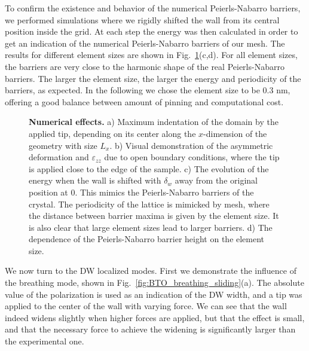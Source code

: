 To confirm the existence and behavior of the numerical Peierls-Nabarro barriers, we performed simulations where we rigidly shifted the wall from its central position inside the grid.
At each step the energy was then calculated in order to get an indication of the numerical Peierls-Nabarro barriers of our mesh.
The results for different element sizes are shown in Fig.~\ref{fig:BTO_numerical_effects}(c,d).
For all element sizes, the barriers are very close to the harmonic shape of the real Peierls-Nabarro barriers. The larger the element size, the larger the energy and periodicity of the barriers, as expected.
In the following we chose the element size to be 0.3 nm, offering a good balance between amount of pinning and computational cost. 
\begin{figure}[h!]
	\caption{\label{fig:BTO_numerical_effects}{\bf Numerical effects.} a) Maximum indentation of the domain by the applied tip, depending on its center along the $x$-dimension of the geometry with size $L_x$. b) Visual demonstration of the asymmetric deformation and $\varepsilon_{zz}$ due to open boundary conditions, where the tip is applied close to the edge of the sample. c) The evolution of the energy when the wall is shifted with $\delta_w$ away from the original position at 0. This mimics the Peierls-Nabarro barriers of the crystal. The periodicity of the lattice is mimicked by mesh, where the distance between barrier maxima is given by the element size. It is also clear that large element sizes lead to larger barriers. d) The dependence of the Peierls-Nabarro barrier height on the element size.}
\end{figure}

We now turn to the DW localized modes.
First we demonstrate the influence of the breathing mode, shown in Fig.~\ref{fig:BTO_breathing_sliding}(a).
The absolute value of the polarization is used as an indication of the DW width, and a tip was applied to the center of the wall with varying force.
We can see that the wall indeed widens slightly when higher forces are applied, but that the effect is small, and that the necessary force to achieve the widening is significantly larger than the experimental one.

